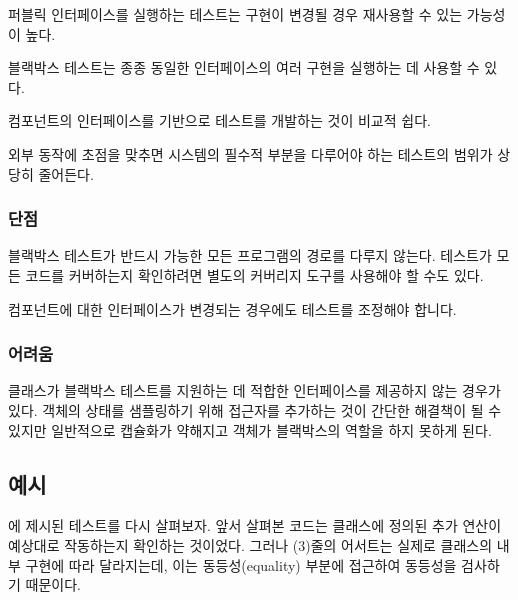 \documentclass[a4paper,10pt,twoside]{book}
\begin{document}
\begin{bulletlist}
\item 퍼블릭 인터페이스를 실행하는 테스트는 구현이 변경될 경우 재사용할 수 있는 가능성이 높다.
\item 블랙박스 테스트는 종종 동일한 인터페이스의 여러 구현을 실행하는 데 사용할 수 있다.
\item 컴포넌트의 인터페이스를 기반으로 테스트를 개발하는 것이 비교적 쉽다.
\item 외부 동작에 초점을 맞추면 시스템의 필수적 부분을 다루어야 하는 테스트의 범위가 상당히 줄어든다.
\end{bulletlist}

\subsubsection*{단점}

\begin{bulletlist}
\item 블랙박스 테스트가 반드시 가능한 모든 프로그램의 경로를 다루지 않는다. 테스트가 모든 코드를 커버하는지 확인하려면 별도의 커버리지 도구를 사용해야 할 수도 있다.
\item 컴포넌트에 대한 인터페이스가 변경되는 경우에도 테스트를 조정해야 합니다.
\end{bulletlist}

\subsubsection*{어려움}

\begin{bulletlist}
\item 클래스가 블랙박스 테스트를 지원하는 데 적합한 인터페이스를 제공하지 않는 경우가 있다. 객체의 상태를 샘플링하기 위해 접근자를 추가하는 것이 간단한 해결책이 될 수 있지만 일반적으로 캡슐화가 약해지고 객체가 블랙박스의 역할을 하지 못하게 된다.
\end{bulletlist}

\subsection*{예시}

에 제시된 테스트를 다시 살펴보자. 앞서 살펴본 코드는  클래스에 정의된 추가 연산이 예상대로 작동하는지 확인하는 것이었다. 그러나 (3)줄의 어서트는 실제로  클래스의 내부 구현에 따라 달라지는데, 이는 동등성(equality) 부분에 접근하여 동등성을 검사하기 때문이다.
\end{document}
